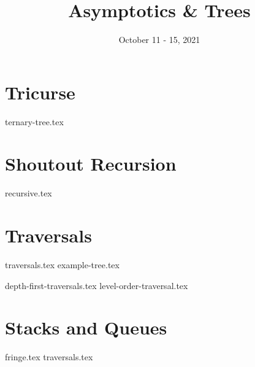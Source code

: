 \documentclass[11pt]{exam}
\title{Asymptotics \& Trees}
\date{October 11 - 15, 2021}
\begin{document}
\maketitle

\section{Tricurse}

\begin{questions}

{ternary-tree.tex}
\end{questions}


\section{Shoutout Recursion}

\begin{questions}
{recursive.tex}
\end{questions}

\clearpage

\section{Traversals}
{traversals.tex}
{example-tree.tex}
\begin{questions}
{depth-first-traversals.tex}
{level-order-traversal.tex}
\enlargethispage{2in}
\end{questions}
\clearpage

\section{Stacks and Queues}
\begin{questions}
{fringe.tex}
{traversals.tex}
\end{questions}
\clearpage
\end{document}
